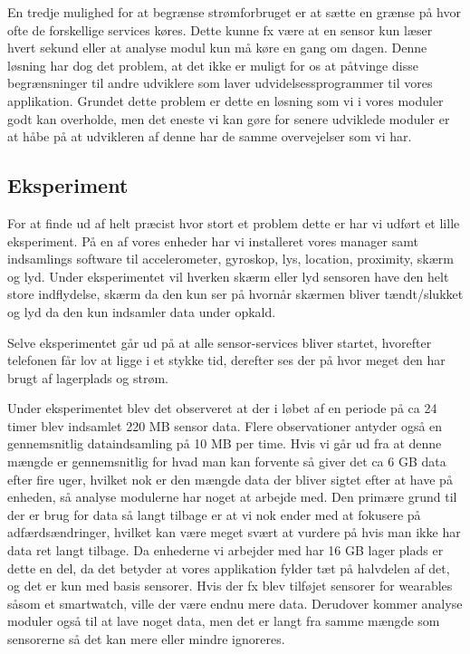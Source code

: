 En tredje mulighed for at begrænse strømforbruget er at sætte en grænse på hvor ofte de forskellige services køres.
Dette kunne fx være at en sensor kun læser hvert sekund eller at analyse modul kun må køre en gang om dagen.
Denne løsning har dog det problem, at det ikke er muligt for os at påtvinge disse begrænsninger til andre udviklere som laver udvidelsessprogrammer til vores applikation.
Grundet dette problem er dette en løsning som vi i vores moduler godt kan overholde, men det eneste vi kan gøre for senere udviklede moduler er at håbe på at udvikleren af denne har de samme overvejelser som vi har. 

\subsection{Eksperiment}
For at finde ud af helt præcist hvor stort et problem dette er har vi udført et lille eksperiment.
På en af vores enheder har vi installeret vores manager samt indsamlings software til accelerometer, gyroskop, lys, location, proximity, skærm og lyd.
Under eksperimentet vil hverken skærm eller lyd sensoren have den helt store indflydelse, skærm da den kun ser på hvornår skærmen bliver tændt/slukket og lyd da den kun indsamler data under opkald.

Selve eksperimentet går ud på at alle sensor-services bliver startet, hvorefter telefonen får lov at ligge i et stykke tid, derefter ses der på hvor meget den har brugt af lagerplads og strøm.

Under eksperimentet blev det observeret at der i løbet af en periode på ca 24 timer blev indsamlet 220 MB sensor data. 
Flere observationer antyder også en gennemsnitlig dataindsamling på 10 MB per time.
Hvis vi går ud fra at denne mængde er gennemsnitlig for hvad man kan forvente så giver det ca 6 GB data efter fire uger, hvilket nok er den mængde data der bliver sigtet efter at have på enheden, så analyse modulerne har noget at arbejde med.
Den primære grund til der er brug for data så langt tilbage er at vi nok ender med at fokusere på adfærdsændringer, hvilket kan være meget svært at vurdere på hvis man ikke har data ret langt tilbage.
Da enhederne vi arbejder med har 16 GB lager plads er dette en del, da det betyder at vores applikation fylder tæt på halvdelen af det, og det er kun med basis sensorer.
Hvis der fx blev tilføjet sensorer for wearables såsom et smartwatch, ville der være endnu mere data.
Derudover kommer analyse moduler også til at lave noget data, men det er langt fra samme mængde som sensorerne så det kan mere eller mindre ignoreres.



